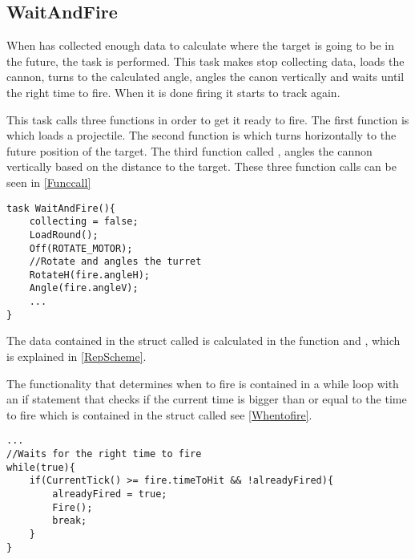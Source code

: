 \subsection{WaitAndFire}
When \name has collected enough data to calculate where the target is going to
be in the future, the task  is performed. This task makes
\name stop collecting data, loads the cannon, turns to the calculated angle,
angles the canon vertically and waits until the right time to fire. When it is done firing
it starts to track again.\nl

This task calls three functions in order to get it ready to fire. The first
function is  which loads a projectile. The second function is
 which turns \name horizontally to the future position of the 
target. The third function called , angles the cannon
vertically based on the distance to the target. These three function calls can
be seen in \autoref{Funccall}\nl

\begin{minipage}[H]{\linewidth}
\begin{lstlisting}[caption = Function calls in \texttt{WaitAndFire}, label =
Funccall] 
task WaitAndFire(){
	collecting = false;
    LoadRound();
    Off(ROTATE_MOTOR);
    //Rotate and angles the turret
    RotateH(fire.angleH);
    Angle(fire.angleV);
    ...
}
\end{lstlisting}
\end{minipage}

The data contained in the struct called  is calculated in the
function  and , which is explained in
\autoref{RepScheme}.

The functionality that determines when to fire is contained in a while loop with
an if statement that checks if the current time is bigger than or equal to the
time to fire which is contained in the struct called  see
\autoref{Whentofire}.\nl
 
\begin{minipage}[H]{\linewidth}
\begin{lstlisting}[caption = While loop that determines when to fire, label =
Whentofire]
 ...
//Waits for the right time to fire
while(true){
	if(CurrentTick() >= fire.timeToHit && !alreadyFired){
    	alreadyFired = true;
        Fire();
        break;
    }
}
\end{lstlisting}
\end{minipage}





